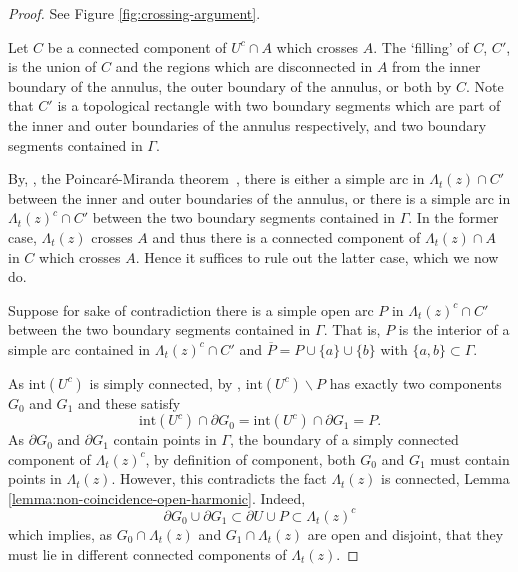 \documentclass[12pt]{amsart}
\numberwithin{equation}{section}
\newcommand{\cluster}[2]{\hyperref[eq:non-co-set]{\mathit{\Lambda}^{#1}_{#2}}}
\begin{document}
	\begin{proof}
		See Figure \ref{fig:crossing-argument}. 
		
		Let $C$ be a connected component of $U^c \cap A$ which crosses $A$. The `filling' of $C$, $C'$, is the union of $C$ and the regions which are disconnected 
		in $A$ from the inner boundary of the annulus, the outer boundary of the annulus, or both by $C$. Note that $C'$ is a topological rectangle
		with two boundary segments which are part of the inner and outer boundaries of the annulus respectively, and two boundary segments contained in $\Gamma$. 
		
		By, \eg, the Poincar\'e-Miranda theorem~\cite{poincaremiranda}, there is either a simple arc in ${\cluster{}{t}(z)} \cap C'$ between the inner and outer boundaries 
		of the annulus, or there is a simple arc in ${\cluster{}{t}(z)}^c \cap C'$ between the two boundary segments contained in $\Gamma$. 
		In the former case, ${\cluster{}{t}(z)}$ crosses $A$ and thus there is a connected component of ${\cluster{}{t}(z)} \cap A$ in $C$ which crosses $A$. Hence it suffices to rule out the latter case, which we now do. 
		
		Suppose for sake of contradiction there is a simple open arc $P$ in ${\cluster{}{t}(z)}^c \cap C'$ between the two boundary segments contained in $\Gamma$. That is, $P$ is the interior of a simple arc contained in ${\cluster{}{t}(z)}^c \cap C'$ and $\overline{P} = P \cup \{a\} \cup \{b\}$
		with $\{a, b\} \subset \Gamma$.
		
		As $\mathrm{int}(U^c)$ is simply connected, by \cite[Proposition 2.12]{pommerenke2013boundary},  
		$\mathrm{int}(U^c) \backslash P$ has exactly two components $G_0$ and $G_1$ and these satisfy
		\begin{equation}
		\mathrm{int}(U^c) \cap \partial G_0 = \mathrm{int}(U^c) \cap \partial G_1 = P.
		\end{equation}
		As $\partial G_0$ and $\partial G_1$ contain points in $\Gamma$, the boundary of a simply connected component of 
		${\cluster{}{t}(z)}^c$, by definition of component, both $G_0$ and $G_1$ must contain points in ${\cluster{}{t}(z)}$.  However, this contradicts the fact ${\cluster{}{t}(z)}$ is connected, Lemma \ref{lemma:non-coincidence-open-harmonic}. 
		Indeed, 
		\[
		\partial G_0 \cup \partial G_1 \subset \partial U \cup P \subset {\cluster{}{t}(z)}^c
		\]
		which implies, as $G_0 \cap  {\cluster{}{t}(z)}$ and $G_1 \cap {\cluster{}{t}(z)}$ are open and disjoint,
		that they must lie in different connected components of ${\cluster{}{t}(z)}$.
	\end{proof}
	
\end{document}
